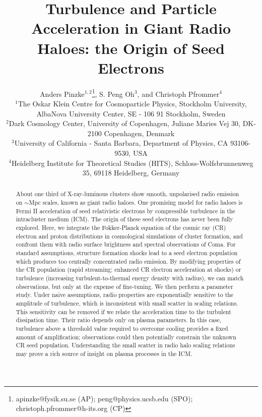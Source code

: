 \documentclass[fleqn,usenatbib,useAMS]{mnras}
\title[Origin of Seed Electrons]{Turbulence and Particle Acceleration in Giant Radio Haloes: the Origin of Seed Electrons}
\author[A. Pinzke, S. Peng Oh and C. Pfrommer] 
{Anders Pinzke$^{1,2}$\thanks{apinzke@fysik.su.se (AP); peng@physics.ucsb.edu (SPO); christoph.pfrommer@h-its.org (CP)}, S. Peng Oh$^{3}$\footnotemark[1], and Christoph Pfrommer$^{4}$\footnotemark[1]\\
$^{1}$The Oskar Klein Centre for Cosmoparticle Physics, Stockholm University, AlbaNova University Center, SE - 106 91
  Stockholm, Sweden\\
$^{2}$Dark Cosmology Center, University of Copenhagen,
  Juliane Maries Vej 30, DK-2100 Copenhagen, Denmark\\
  $^{3}$University of California - Santa Barbara,
  Department of Physics, CA 93106-9530, USA\\
$^{4}$Heidelberg Institute for Theoretical Studies
  (HITS), Schloss-Wolfsbrunnenweg 35, 69118 Heidelberg, Germany}
\begin{document}
\pagerange{\pageref{firstpage}--\pageref{lastpage}} 
\maketitle
\label{firstpage}



 
\begin{abstract}
  About one third of X-ray-luminous clusters show smooth, unpolarised radio
  emission on $\sim$Mpc scales, known as giant radio haloes. One promising model
  for radio haloes is Fermi II acceleration of seed relativistic electrons by
  compressible turbulence in the intracluster medium (ICM). The origin of these
  seed electrons has never been fully explored. Here, we integrate the
  Fokker-Planck equation of the cosmic ray (CR) electron and proton
  distributions in cosmological simulations of cluster formation, and confront
  them with radio surface brightness and spectral observations of Coma. For
  standard assumptions, structure formation shocks lead to a seed electron
  population which produces too centrally concentrated radio emission. By
  modifying properties of the CR population (rapid streaming; enhanced CR
  electron acceleration at shocks) or turbulence (increasing
  turbulent-to-thermal energy density with radius), we can match observations,
  but only at the expense of fine-tuning. We then perform a parameter
  study. Under naive assumptions, radio properties are exponentially sensitive
  to the amplitude of turbulence, which is inconsistent with small scatter in
  scaling relations. This sensitivity can be removed if we relate the
  acceleration time to the turbulent dissipation time. Their ratio depends only
  on plasma parameters. In this case, turbulence above a threshold value
  required to overcome cooling provides a fixed amount of amplification;
  observations could then potentially constrain the unknown CR seed
  population. Understanding the small scatter in radio halo scaling relations
  may prove a rich source of insight on plasma processes in the ICM.
\end{abstract} 

\end{document}
